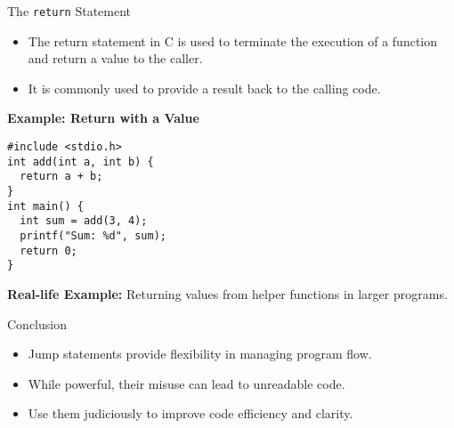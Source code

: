 \documentclass{beamer}
\begin{document}
\begin{frame}{The \texttt{return} Statement}
    \begin{itemize}
        \item The return statement in C is used to terminate the execution of a function and return a value to the caller.
        \item It is commonly used to provide a result back to the calling code.
    \end{itemize}
    \vspace{0.3cm}
    \textbf{Example: Return with a Value}
    \begin{block}{}
        \texttt{\#include <stdio.h>}\\
        \texttt{int add(int a, int b) \{}\\
        \texttt{\ \ return a + b;}\\
        \texttt{\}}\\
        \texttt{int main() \{}\\
        \texttt{\ \ int sum = add(3, 4);}\\
        \texttt{\ \ printf("Sum: \%d", sum);}\\
        \texttt{\ \ return 0;}\\
        \texttt{\}}
    \end{block}
    \textbf{Real-life Example:} Returning values from helper functions in larger programs.
\end{frame}

\begin{frame}{Conclusion}
    \begin{itemize}
        \item Jump statements provide flexibility in managing program flow.
        \item While powerful, their misuse can lead to unreadable code.
        \item Use them judiciously to improve code efficiency and clarity.
    \end{itemize}
\end{frame}
\end{document}
